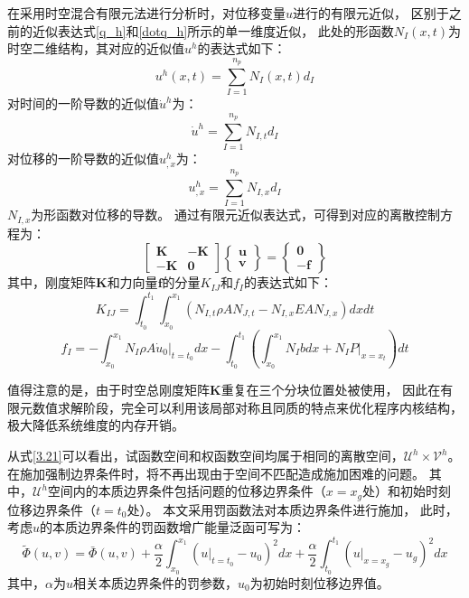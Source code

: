 在采用时空混合有限元法进行分析时，对位移变量$u$进行的有限元近似，
区别于之前的近似表达式\eqref{q_h}和\eqref{dotq_h}所示的单一维度近似，
此处的形函数$N_I(x,t)$为时空二维结构，其对应的近似值$u^h$的表达式如下：
\begin{equation}\label{uv_h}
u^h (x,t) = \sum_{I=1}^{n_p} N_I (x,t) d_I
\end{equation}
对时间的一阶导数的近似值$\dot u^h$为：
\begin{equation}\label{dotuv_h}
    \dot u^h = \sum_{I=1}^{n_p} N_{I,t} d_I
\end{equation}
对位移的一阶导数的近似值$u_{,x}^h$为：
\begin{equation}\label{uv_x^h}
    u_{,x}^h= \sum_{I=1}^{n_p} N_{I,x} d_I
\end{equation}
$N_{I,x}$为形函数对位移的导数。
通过有限元近似表达式，可得到对应的离散控制方程为：
\begin{equation}
\begin{bmatrix}
\boldsymbol K & -\boldsymbol K \\ -\boldsymbol K & \boldsymbol 0
\end{bmatrix}
\begin{Bmatrix}
\boldsymbol u \\ \boldsymbol v
\end{Bmatrix} =
\begin{Bmatrix}
 \boldsymbol 0 \\ -\boldsymbol f
\end{Bmatrix}
\end{equation}
其中，刚度矩阵$\boldsymbol K$和力向量$\boldsymbol f$的分量$K_{IJ}$和$f_I$的表达式如下：
\begin{equation}
    K_{IJ} = \int_{t_0}^{t_1} \int_{x_0}^{x_1} \left( N_{I,t}\rho A N_{J,t} - N_{I,x}EA N_{J,x} \right) dx dt
\end{equation}
\begin{equation}
    f_I = - \int_{x_0}^{x_1} N_I \rho A \dot u_0 \vert_{t=t_0} dx
    - \int_{t_0}^{t_1} \left( \int_{x_0}^{x_1} N_I b dx + N_I P \vert_{x=x_t} \right) dt
\end{equation}

值得注意的是，由于时空总刚度矩阵$\boldsymbol{K}$重复在三个分块位置处被使用，
因此在有限元数值求解阶段，完全可以利用该局部对称且同质的特点来优化程序内核结构，
极大降低系统维度的内存开销。

从式\eqref{3.21}可以看出，试函数空间和权函数空间均属于相同的离散空间，$\mathcal{U}^h\times \mathcal{V}^h$。
在施加强制边界条件时，将不再出现由于空间不匹配造成施加困难的问题。
其中，$\mathcal U^h$空间内的本质边界条件包括问题的位移边界条件（$x=x_g$处）和初始时刻位移边界条件（$t=t_0$处）。
本文采用罚函数法对本质边界条件进行施加，
此时，考虑$u$的本质边界条件的罚函数增广能量泛函可写为：
\begin{equation}
\tilde\Phi(u,v)
= \bar \Phi(u,v)
+ \frac{\alpha}{2}\int_{x_0}^{x_1} \left(u \vert_{t=t_0}-u_0\right)^2 dx
+ \frac{\alpha}{2}\int_{t_0}^{t_1} \left(u\vert_{x=x_g}-u_g\right)^2 dx
\end{equation}
其中，$\alpha$为$u$相关本质边界条件的罚参数，$u_0$为初始时刻位移边界值。

